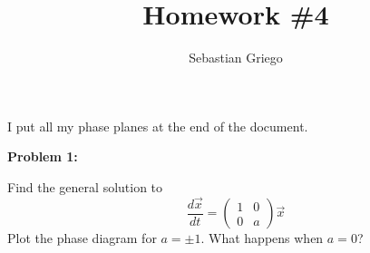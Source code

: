 \documentclass[12pt]{article}
\newenvironment{problem}[1]{
    \textbf{Problem #1:}
}{
    \rmfamily \vspace{1em}
}
\begin{document}
\title{Homework \#4}  %
\author{Sebastian Griego}  %
\maketitle

I put all my phase planes at the end of the document.

\begin{problem}{1}
    Find the general solution to
    \[
        \frac{d\vec{x}}{dt} = \begin{pmatrix} 1 & 0 \\ 0 & a \end{pmatrix} \vec{x}
    \]
    Plot the phase diagram for \(a = \pm 1\). What happens when \(a = 0\)?
\end{problem}
\end{document}
